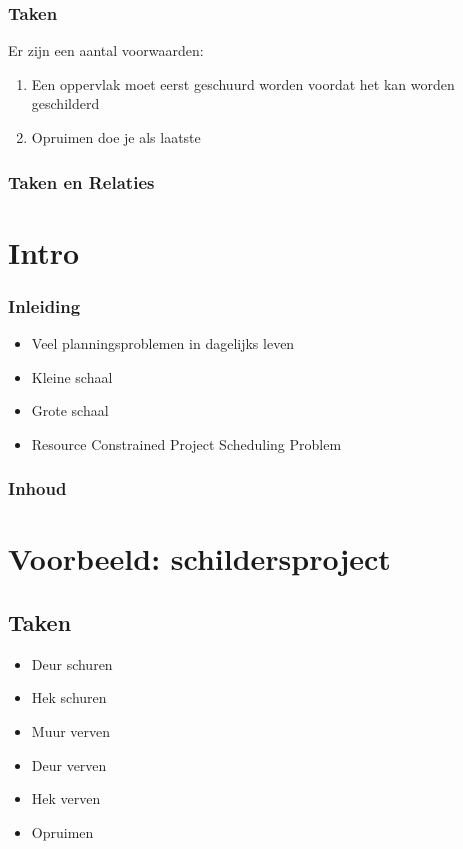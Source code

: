 \documentclass{beamer}
\theoremstyle{definition}
\newcommand{\inputtikz}[1]{}
\begin{document}
\begin{frame}
    	\frametitle{Taken}
   	Er zijn een aantal voorwaarden:
	\begin{enumerate}
	    	\item Een oppervlak moet eerst geschuurd worden voordat het kan worden geschilderd
		\item Opruimen doe je als laatste
	\end{enumerate}
\end{frame}

\begin{frame}
	\frametitle{Taken en Relaties}
	\vspace{-1em}
	\begin{figure}[ht]
		\makebox[\textwidth][c]{\resizebox{.8\paperwidth}{!}{
			\inputtikz{activity_graph_simple}
		}}
		\vspace{-1em}
	\end{figure}
\end{frame}

\section*{Intro}
\begin{frame}
    \frametitle{Inleiding}
    \begin{itemize}
	\item Veel planningsproblemen in dagelijks leven
        \item Kleine schaal
        \item Grote schaal
	\item Resource Constrained Project Scheduling Problem
    \end{itemize}
\end{frame}

\begin{frame}
    \frametitle{Inhoud}
    \tableofcontents
\end{frame}

\section[Schildersproject]{Voorbeeld: schildersproject}

\subsection{Taken}

\begin{frame}
	\begin{itemize}
	
		\item Deur schuren
		\item Hek schuren
		\item<2-> Muur verven
		\item<2-> Deur verven
		\item<2-> Hek verven
		\item<3-> Opruimen
	\end{itemize}
\end{frame}
\end{document}

